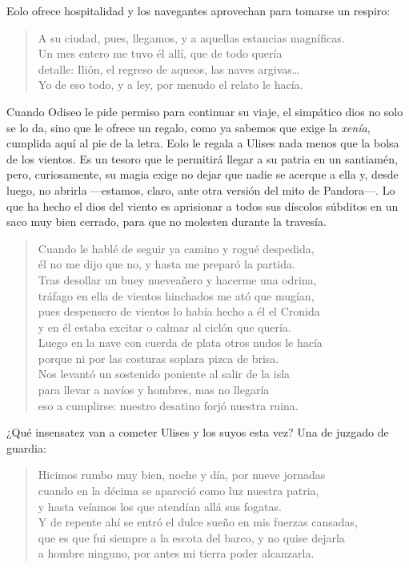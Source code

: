 Eolo ofrece hospitalidad y los navegantes aprovechan para tomarse un respiro:

\begin{verse}
A su ciudad, pues, llegamos, y a aquellas estancias magníficas.\\
Un mes entero me tuvo él allí, que de todo quería\\
detalle: Ilión, el regreso de aqueos, las naves argivas…\\
Yo de eso todo, y a ley, por menudo el relato le hacía.
\end{verse}

Cuando Odiseo le pide permiso para continuar su viaje, el simpático dios no solo se lo da, sino que le ofrece un regalo, como ya sabemos que exige la \emph{xenía}, cumplida aquí al pie de la letra. Eolo le regala a Ulises nada menos que la bolsa de los vientos. Es un tesoro que le permitirá llegar a su patria en un santiamén, pero, curiosamente, su magia exige no dejar que nadie se acerque a ella y, desde luego, no abrirla ---estamos, claro, ante otra versión del mito de Pandora---. Lo que ha hecho el dios del viento es aprisionar a todos sus díscolos súbditos en un saco muy bien cerrado, para que no molesten durante la travesía.

\begin{verse}
Cuando le hablé de seguir ya camino y rogué despedida,\\
él no me dijo que no, y hasta me preparó la partida.\\
Tras desollar un buey nueveañero y hacerme una odrina,\\
tráfago en ella de vientos hinchados me ató que mugían,\\
pues despensero de vientos lo había hecho a él el Cronida\\
y en él estaba excitar o calmar al ciclón que quería.\\
Luego en la nave con cuerda de plata otros nudos le hacía\\
porque ni por las costuras soplara pizca de brisa.\\
Nos levantó un sostenido poniente al salir de la isla\\
para llevar a navíos y hombres, mas no llegaría\\
eso a cumplirse: nuestro desatino forjó nuestra ruina.
\end{verse}

¿Qué insensatez van a cometer Ulises y los suyos esta vez? Una de juzgado de guardia:

\begin{verse}
Hicimos rumbo muy bien, noche y día, por nueve jornadas\\
cuando en la décima se apareció como luz nuestra patria,\\
y hasta veíamos los que atendían allá sus fogatas.\\
Y de repente ahí se entró el dulce sueño en mis fuerzas cansadas,\\
que es que fui siempre a la escota del barco, y no quise dejarla\\
a hombre ninguno, por antes mi tierra poder alcanzarla.
\end{verse}

